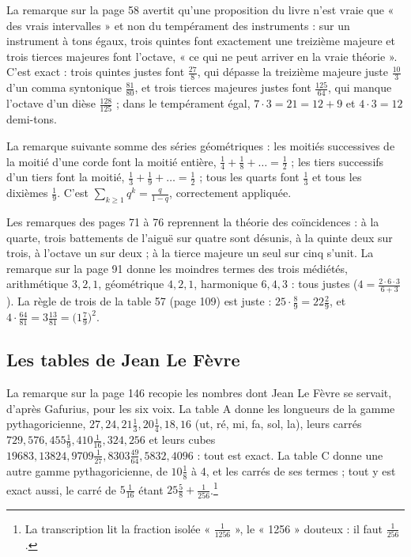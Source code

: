 \documentclass[11pt,a4paper]{article}
\begin{document}
La remarque sur la page 58 avertit qu'une proposition du livre n'est vraie
que « des vrais intervalles » et non du tempérament des instruments : sur un
instrument à tons égaux, trois quintes font exactement une treizième majeure
et trois tierces majeures font l'octave, « ce qui ne peut arriver en la vraie
théorie ». C'est exact : trois quintes justes font $\frac{27}{8}$, qui dépasse la
treizième majeure juste $\frac{10}{3}$ d'un comma syntonique $\frac{81}{80}$, et
trois tierces majeures justes font $\frac{125}{64}$, qui manque l'octave d'un
dièse $\frac{128}{125}$ ; dans le tempérament égal, $7 \cdot 3 = 21 = 12 + 9$ et
$4 \cdot 3 = 12$ demi-tons.

La remarque suivante somme des séries géométriques : les moitiés successives de
la moitié d'une corde font la moitié entière,
$\frac14 + \frac18 + \dots = \frac12$ ; les tiers successifs d'un tiers font la
moitié, $\frac13 + \frac19 + \dots = \frac12$ ; tous les quarts font
$\frac13$ et tous les dixièmes $\frac19$. C'est
$\sum_{k \ge 1} q^k = \frac{q}{1-q}$, correctement appliquée.

Les remarques des pages 71 à 76 reprennent la théorie des coïncidences : à
la quarte, trois battements de l'aiguë sur quatre sont désunis, à la quinte
deux sur trois, à l'octave un sur deux ; à la tierce majeure un seul sur
cinq s'unit. La remarque sur la page 91 donne les moindres termes des trois
médiétés, arithmétique $3, 2, 1$, géométrique $4, 2, 1$, harmonique $6, 4, 3$ :
tous justes ($4 = \frac{2\cdot 6\cdot 3}{6 + 3}$). La règle de trois de la
table 57 (page 109) est juste : $25 \cdot \frac89 = 22\frac29$, et
$4\cdot\frac{64}{81} = 3\frac{13}{81} = \bigl(1\frac79\bigr)^2$.

\subsection*{Les tables de Jean Le Fèvre}

La remarque sur la page 146 recopie les nombres dont Jean Le Fèvre se servait,
d'après Gafurius, pour les six voix. La table A donne les longueurs de la
gamme pythagoricienne, $27, 24, 21\frac13, 20\frac14, 18, 16$ (ut, ré, mi, fa,
sol, la), leurs carrés $729, 576, 455\frac19, 410\frac{1}{16}, 324, 256$ et
leurs cubes $19683, 13824, 9709\frac{1}{27}, 8303\frac{49}{64}, 5832, 4096$ :
tout est exact. La table C donne une autre gamme pythagoricienne, de
$10\frac18$ à 4, et les carrés de ses termes ; tout y est exact aussi, le
carré de $5\frac{1}{16}$ étant $25\frac58 + \frac{1}{256}$.\footnote{La
transcription lit la fraction isolée « $\frac{1}{1256}$ », le « 1256 » douteux :
il faut $\frac{1}{256}$.}
\end{document}
